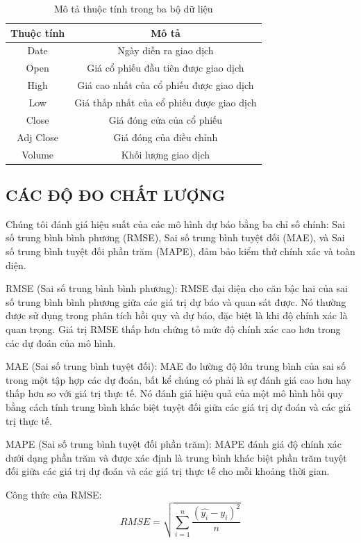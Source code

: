 \documentclass[conference]{IEEEtran}
\begin{document}
\begin{table}[H]
  \centering
  \caption{Mô tả thuộc tính trong ba bộ dữ liệu}
\begin{tabular}{|>{\columncolor{red!20}}c|c|}
    \hline
     \rowcolor{red!20} Thuộc tính & Mô tả\\ \hline
     Date & Ngày diễn ra giao dịch \\ \hline
     Open & Giá cổ phiếu đầu tiên được giao dịch\\ \hline
     High & Giá cao nhất của cổ phiếu được giao dịch\\ \hline
     Low & Giá thấp nhất của cổ phiếu được giao dịch\\ \hline
     Close & Giá đóng cửa của cổ phiếu\\ \hline
     Adj Close & Giá đóng của điều chỉnh\\ \hline
     Volume & Khối lượng giao dịch\\ \hline
\end{tabular}
\end{table}
\subsection{CÁC ĐỘ ĐO CHẤT LƯỢNG}
Chúng tôi đánh giá hiệu suất của các mô hình dự báo bằng ba chỉ số chính: Sai số trung bình bình phương (RMSE), Sai số trung bình tuyệt đối (MAE), và Sai số trung bình tuyệt đối phần trăm (MAPE), đảm bảo kiểm thử chính xác và toàn diện.

RMSE (Sai số trung bình bình phương): RMSE đại diện cho căn bậc hai của sai số trung bình bình phương giữa các giá trị dự báo và quan sát được. Nó thường được sử dụng trong phân tích hồi quy và dự báo, đặc biệt là khi độ chính xác là quan trọng. Giá trị RMSE thấp hơn chứng tỏ mức độ chính xác cao hơn trong các dự đoán của mô hình.

MAE (Sai số trung bình tuyệt đối): MAE đo lường độ lớn trung bình của sai số trong một tập hợp các dự đoán, bất kể chúng có phải là sự đánh giá cao hơn hay thấp hơn so với giá trị thực tế. Nó đánh giá hiệu quả của một mô hình hồi quy bằng cách tính trung bình khác biệt tuyệt đối giữa các giá trị dự đoán và các giá trị thực tế.

MAPE (Sai số trung bình tuyệt đối phần trăm): MAPE đánh giá độ chính xác dưới dạng phần trăm và được xác định là trung bình khác biệt phần trăm tuyệt đối giữa các giá trị dự đoán và các giá trị thực tế cho mỗi khoảng thời gian.

Công thức của RMSE:
\[RMSE=\sqrt{\sum_{i=1}^{n} \frac{(\hat{y_i}-y_i )^2}{n} }\]
\end{document}
